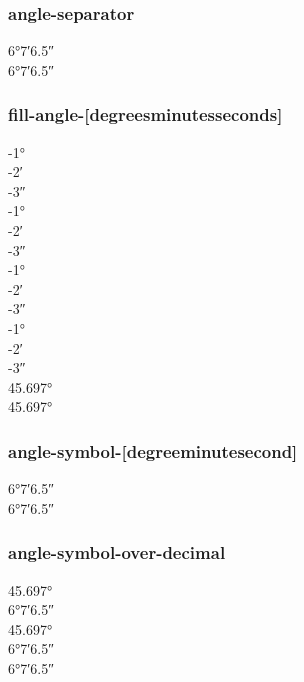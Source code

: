 \documentclass{article}
\begin{document}
\subsubsection{angle-separator}
\ang{6;7;6.5} \\ %
\ang[angle-separator = \,]{6;7;6.5}

\subsubsection{fill-angle-[degrees\textbar minutes\textbar seconds]}
\ang{-1;;} \\
\ang{;-2;} \\
\ang{;;-3} \\
{
\ang{-1;;} \\
\ang{;-2;} \\
\ang{;;-3} \\
}
{
\ang{-1;;} \\
\ang{;-2;} \\
\ang{;;-3} \\
}
{
\ang{-1;;} \\
\ang{;-2;} \\
\ang{;;-3} \\
}
\ang[fill-angle-minutes,fill-angle-seconds]{45.697}\\
\ang[color=blue,fill-angle-minutes,fill-angle-seconds]{45.697}

\subsubsection{angle-symbol-[degree\textbar minute\textbar second]}
{
\ang{6;7;6.5} \\
\ang{6;7;6.5}
}

\subsubsection{angle-symbol-over-decimal}
\ang{45.697} \\
\ang{6;7;6.5} \\
\ang[angle-symbol-over-decimal]{45.697} \\
\ang[angle-symbol-over-decimal]{6;7;6.5}\\
\ang[color=blue,angle-symbol-over-decimal]{6;7;6.5}
\end{document}
